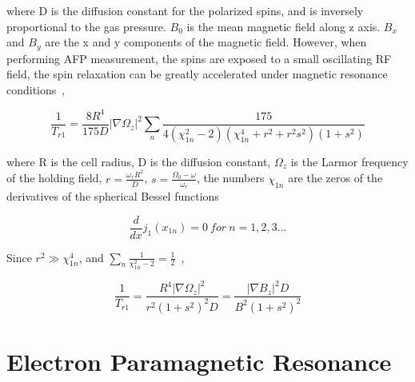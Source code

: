where D is the diffusion constant for the polarized spins, and is inversely proportional to the gas pressure. $B_{0}$ is the mean magnetic field along z axis. $B_{x}$ and $B_{y}$ are the x and y components of the magnetic field. However, when performing AFP measurement, the spins are exposed to a small oscillating RF field, the spin relaxation can be greatly accelerated under magnetic resonance conditions~\cite{PhysRevA.38.5092},

\begin{equation}
\frac{1}{T_{r1}} = \frac{8R^{4}}{175D}|\nabla \Omega_{z}|^{2}\sum_{n} \frac{175}{4(\chi_{1n}^{2}-2)(\chi_{1n}^{4}+r^{2}+r^{2}s^{2})(1+s^{2})}
\end{equation}

where R is the cell radius, D is the diffusion constant, $\Omega_{z}$ is the Larmor frequency of the holding field, $r=\frac{\omega_{r}R^{2}}{D}$, $s=\frac{\Omega_{0}-\omega}{\omega_{r}}$, the numbers $\chi_{1n}$ are the zeros of the derivatives of the spherical Bessel functions

\begin{equation}
\frac{d}{dx}j_{1}(x_{1n})=0~for~n=1,2,3...
\end{equation}

Since $r^{2}\gg \chi_{1n}^{4}$, and $\sum_{n}\frac{1}{\chi_{1n}^{2}-2}=\frac{1}{2}$~\cite{PhysRevA.37.2877},

\begin{equation}
\frac{1}{T_{r1}}=\frac{R^{4}|\nabla\Omega_{z}|^{2}}{r^{2}(1+s^{2})^{2}D}=\frac{|\nabla B_{z}|^{2}D}{B^{2}(1+s^{2})^2}
\end{equation}























\section{Electron Paramagnetic Resonance}

